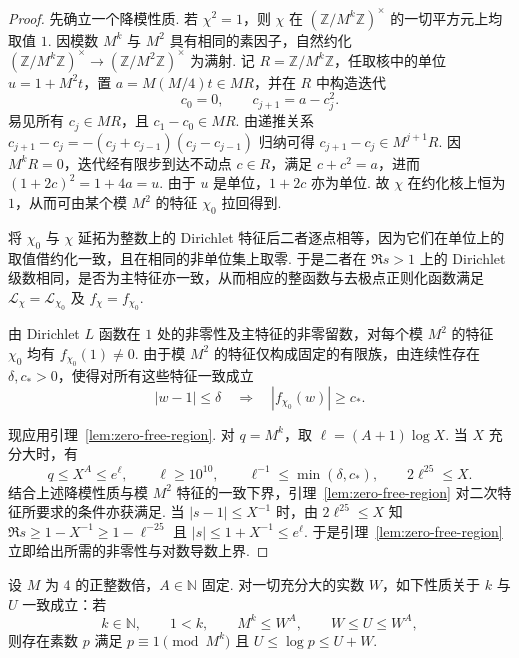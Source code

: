 \begin{proof}
先确立一个降模性质. 若 $\chi^2=1$，则 $\chi$ 在 $(\mathbb Z/M^k\mathbb Z)^\times$ 的一切平方元上均取值 $1$. 因模数 $M^k$ 与 $M^2$ 具有相同的素因子，自然约化 $(\mathbb Z/M^k\mathbb Z)^\times\to(\mathbb Z/M^2\mathbb Z)^\times$ 为满射. 记 $R=\mathbb Z/M^k\mathbb Z$，任取核中的单位 $u=1+M^2t$，置 $a=M(M/4)t\in MR$，并在 $R$ 中构造迭代
\[
 c_0=0,\qquad c_{j+1}=a-c_j^2 .
\]
易见所有 $c_j\in MR$，且 $c_1-c_0\in MR$. 由递推关系
$c_{j+1}-c_j=-(c_j+c_{j-1})(c_j-c_{j-1})$ 归纳可得 $c_{j+1}-c_j\in M^{j+1}R$. 因 $M^kR=0$，迭代经有限步到达不动点 $c\in R$，满足 $c+c^2=a$，进而 $(1+2c)^2=1+4a=u$. 由于 $u$ 是单位，$1+2c$ 亦为单位. 故 $\chi$ 在约化核上恒为 $1$，从而可由某个模 $M^2$ 的特征 $\chi_0$ 拉回得到.

将 $\chi_0$ 与 $\chi$ 延拓为整数上的 Dirichlet 特征后二者逐点相等，因为它们在单位上的取值借约化一致，且在相同的非单位集上取零. 于是二者在 $\Re s>1$ 上的 Dirichlet 级数相同，是否为主特征亦一致，从而相应的整函数与去极点正则化函数满足 $\mathcal L_\chi=\mathcal L_{\chi_0}$ 及 $f_\chi=f_{\chi_0}$.

由 Dirichlet $L$ 函数在 $1$ 处的非零性及主特征的非零留数，对每个模 $M^2$ 的特征 $\chi_0$ 均有 $f_{\chi_0}(1)\ne0$. 由于模 $M^2$ 的特征仅构成固定的有限族，由连续性存在 $\delta,c_*>0$，使得对所有这些特征一致成立
\[
 |w-1|\le\delta\quad\Longrightarrow\quad |f_{\chi_0}(w)|\ge c_* .
\]

现应用引理~\ref{lem:zero-free-region}. 对 $q=M^k$，取 $\ell=(A+1)\log X$. 当 $X$ 充分大时，有
\[
 q\le X^A\le e^\ell,\qquad
 \ell\ge10^{10},\qquad
 \ell^{-1}\le\min(\delta,c_*),\qquad
 2\ell^{25}\le X .
\]
结合上述降模性质与模 $M^2$ 特征的一致下界，引理~\ref{lem:zero-free-region} 对二次特征所要求的条件亦获满足. 当 $|s-1|\le X^{-1}$ 时，由 $2\ell^{25}\le X$ 知
$\Re s\ge1-X^{-1}\ge1-\ell^{-25}$ 且 $|s|\le1+X^{-1}\le e^\ell$.
于是引理~\ref{lem:zero-free-region} 立即给出所需的非零性与对数导数上界.
\end{proof}

\begin{lemma}[固定底数幂模数的素数窗口]
\label{lem:prime-window}
\emitthmsource
设 $M$ 为 $4$ 的正整数倍，$A\in\mathbb N$ 固定. 对一切充分大的实数 $W$，如下性质关于 $k$ 与 $U$ 一致成立：若
\[
 k\in\mathbb N,\qquad 1<k,\qquad
 M^k\le W^A,\qquad W\le U\le W^A,
\]
则存在素数 $p$ 满足 $p\equiv1\pmod{M^k}$ 且 $U\le\log p\le U+W$.
\end{lemma}

